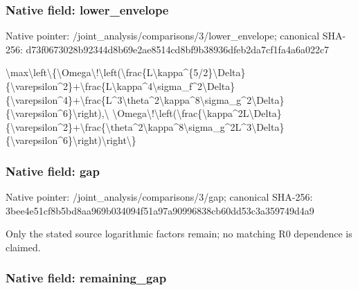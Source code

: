 \documentclass[10pt,a4paper]{article}
\begin{document}
\subsubsection{Native field: lower\_envelope}


Native pointer: /joint\_analysis/comparis\allowbreak{}ons/3/lower\_envelope; canonical SHA-256: d73f0673028b92344d8b69e2\allowbreak{}ae8514cd8bf9b38936dfeb2d\allowbreak{}a7cf1fa4a6a022c7


\textbackslash{}max\textbackslash{}left\textbackslash{}\{\textbackslash{}Omega\textbackslash{}!\textbackslash{}left\allowbreak{}(\textbackslash{}frac\{L\textbackslash{}kappa\textasciicircum{}\{5/2\}\textbackslash{}Del\allowbreak{}ta\}\{\textbackslash{}varepsilon\textasciicircum{}2\}+\textbackslash{}frac\allowbreak{}\{L\textbackslash{}kappa\textasciicircum{}4\textbackslash{}sigma\_f\textasciicircum{}2\textbackslash{}Del\allowbreak{}ta\}\{\textbackslash{}varepsilon\textasciicircum{}4\}+\textbackslash{}frac\allowbreak{}\{L\textasciicircum{}3\textbackslash{}theta\textasciicircum{}2\textbackslash{}kappa\textasciicircum{}8\textbackslash{}sig\allowbreak{}ma\_g\textasciicircum{}2\textbackslash{}Delta\}\{\textbackslash{}varepsilo\allowbreak{}n\textasciicircum{}6\}\textbackslash{}right),\textbackslash{} \textbackslash{}Omega\textbackslash{}!\textbackslash{}left(\textbackslash{}frac\{\textbackslash{}kap\allowbreak{}pa\textasciicircum{}2L\textbackslash{}Delta\}\{\textbackslash{}varepsilon\allowbreak{}\textasciicircum{}2\}+\textbackslash{}frac\{\textbackslash{}theta\textasciicircum{}2\textbackslash{}kappa\allowbreak{}\textasciicircum{}8\textbackslash{}sigma\_g\textasciicircum{}2L\textasciicircum{}3\textbackslash{}Delta\}\{\textbackslash{}\allowbreak{}varepsilon\textasciicircum{}6\}\textbackslash{}right)\textbackslash{}rig\allowbreak{}ht\textbackslash{}\}


\subsubsection{Native field: gap}


Native pointer: /joint\_analysis/comparisons/3/gap; canonical SHA-256: 3bee4e51cf8b5bd8aa969b03\allowbreak{}4094f51a97a90996838cb60d\allowbreak{}d53c3a359749d4a9


Only the stated source logarithmic factors remain; no matching R0 dependence is claimed.


\subsubsection{Native field: remaining\_gap}
\end{document}
